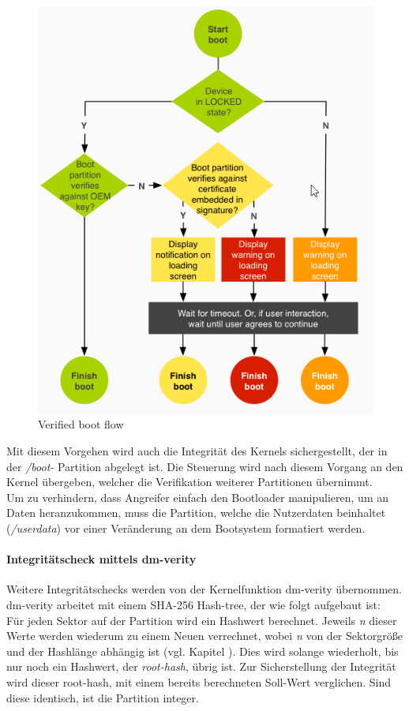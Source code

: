 	\begin{figure}[h]
		\centering
		\includegraphics[width=0.7\linewidth, height=0.5\textheight]{android_pages/graphics/VerifiedBoot}
		\caption[Verified boot flow\protect\cite{VerifyingBoot}]{Verified boot flow
		\cite{VerifyingBoot}}
		\label{fig:VerifiedBoot}
	\end{figure}
	
	Mit diesem Vorgehen wird auch die Integrität des Kernels sichergestellt, der
	in der \textit{/boot-} Partition abgelegt ist. Die Steuerung wird nach diesem
	Vorgang an den Kernel übergeben, welcher die Verifikation weiterer Partitionen
	übernimmt.\\
	Um zu verhindern, dass Angreifer einfach den Bootloader manipulieren, um an
	Daten heranzukommen, muss die Partition, welche die Nutzerdaten beinhaltet
	(\textit{/userdata}) vor einer Veränderung an dem Bootsystem formatiert
	werden.
	
	\paragraph{Integritätscheck mittels dm-verity}
	Weitere Integritätschecks werden von der Kernelfunktion dm-verity übernommen.
	dm-verity arbeitet mit einem SHA-256 Hash-tree, der wie folgt aufgebaut ist:\\
	Für jeden Sektor auf der Partition wird ein Hashwert berechnet. Jeweils
	\textit{n} dieser Werte werden wiederum zu einem Neuen verrechnet, wobei
	\textit{n} von der Sektorgröße und der Hashlänge abhängig ist (vgl. Kapitel
	\cite{dm-verity-doc}). Dies wird solange wiederholt, bis nur noch ein
	Hashwert, der \textit{root-hash}, übrig ist. Zur Sicherstellung der Integrität
	wird dieser root-hash, mit einem bereits berechneten Soll-Wert verglichen.
	Sind diese identisch, ist die Partition integer.
	

